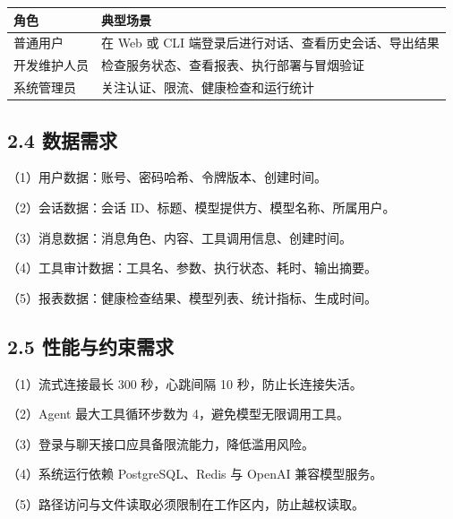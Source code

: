\documentclass[UTF8]{ctexart}
\begin{document}
\begin{longtable}[]{@{}
  >{\raggedright\arraybackslash}p{}
  >{\raggedright\arraybackslash}p{}@{}}
\toprule\noalign{}
\begin{minipage}[b]{\linewidth}\raggedright
角色
\end{minipage} & \begin{minipage}[b]{\linewidth}\raggedright
典型场景
\end{minipage} \\
\midrule\noalign{}
\endhead
\bottomrule\noalign{}
\endlastfoot
普通用户 & 在 Web 或 CLI 端登录后进行对话、查看历史会话、导出结果 \\
开发维护人员 & 检查服务状态、查看报表、执行部署与冒烟验证 \\
系统管理员 & 关注认证、限流、健康检查和运行统计 \\
\end{longtable}

\subsection{\texorpdfstring{\textbf{2.4
数据需求}}{2.4 数据需求}}\label{ux6570ux636eux9700ux6c42}

（1）用户数据：账号、密码哈希、令牌版本、创建时间。

（2）会话数据：会话 ID、标题、模型提供方、模型名称、所属用户。

（3）消息数据：消息角色、内容、工具调用信息、创建时间。

（4）工具审计数据：工具名、参数、执行状态、耗时、输出摘要。

（5）报表数据：健康检查结果、模型列表、统计指标、生成时间。

\subsection{\texorpdfstring{\textbf{2.5
性能与约束需求}}{2.5 性能与约束需求}}\label{ux6027ux80fdux4e0eux7ea6ux675fux9700ux6c42}

（1）流式连接最长 300 秒，心跳间隔 10 秒，防止长连接失活。

（2）Agent 最大工具循环步数为 4，避免模型无限调用工具。

（3）登录与聊天接口应具备限流能力，降低滥用风险。

（4）系统运行依赖 PostgreSQL、Redis 与 OpenAI 兼容模型服务。

（5）路径访问与文件读取必须限制在工作区内，防止越权读取。
\end{document}
